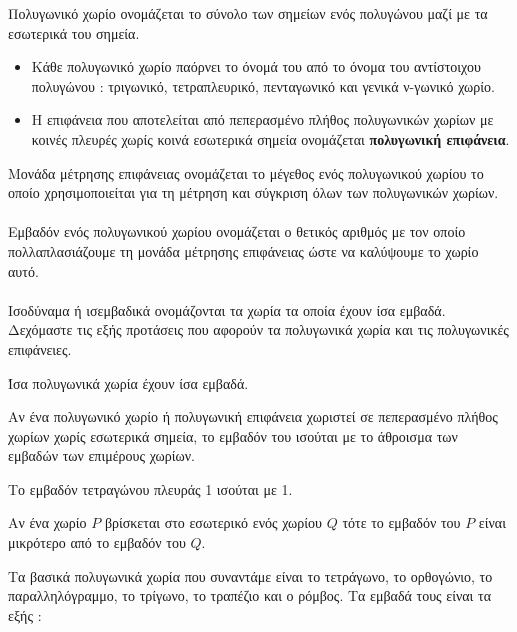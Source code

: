 \documentclass[twoside,nofonts,internet,shmeiwseis]{thewria}
\begin{document}
\orismoi
{}
Πολυγωνικό χωρίο ονομάζεται το σύνολο των σημείων ενός πολυγώνου μαζί με τα εσωτερικά του σημεία.
\begin{itemize}[itemsep=0mm]
\item Κάθε πολυγωνικό χωρίο παόρνει το όνομά του από το όνομα του αντίστοιχου πολυγώνου : τριγωνικό, τετραπλευρικό, πενταγωνικό και γενικά ν-γωνικό χωρίο.
\item Η επιφάνεια που αποτελείται από πεπερασμένο πλήθος πολυγωνικών χωρίων με κοινές πλευρές χωρίς κοινά εσωτερικά σημεία ονομάζεται \textbf{πολυγωνική επιφάνεια}.
\end{itemize}
Μονάδα μέτρησης επιφάνειας ονομάζεται το μέγεθος ενός πολυγωνικού χωρίου το οποίο χρησιμοποιείται για τη μέτρηση και σύγκριση όλων των πολυγωνικών χωρίων.\\\\
Εμβαδόν ενός πολυγωνικού χωρίου ονομάζεται ο θετικός αριθμός με τον οποίο πολλαπλασιάζουμε τη μονάδα μέτρησης επιφάνειας ώστε να καλύψουμε το χωρίο αυτό.\\\\
Ισοδύναμα ή ισεμβαδικά ονομάζονται τα χωρία τα οποία έχουν ίσα εμβαδά.
\thewrhmata
{}
Δεχόμαστε τις εξής προτάσεις που αφορούν τα πολυγωνικά χωρία και τις πολυγωνικές επιφάνειες.
\begin{rlist}
\item Ίσα πολυγωνικά χωρία έχουν ίσα εμβαδά.
\item Αν ένα πολυγωνικό χωρίο ή πολυγωνική επιφάνεια χωριστεί σε πεπερασμένο πλήθος χωρίων χωρίς εσωτερικά σημεία, το εμβαδόν του ισούται με το άθροισμα των εμβαδών των επιμέρους χωρίων.
\item Το εμβαδόν τετραγώνου πλευράς 1 ισούται με 1.
\item Αν ένα χωρίο $ P $ βρίσκεται στο εσωτερικό ενός χωρίου $ Q $ τότε το εμβαδόν του $ P $ είναι μικρότερο από το εμβαδόν του $ Q $.
\end{rlist}
\newpage
\noindent
{}
Τα βασικά πολυγωνικά χωρία που συναντάμε είναι το τετράγωνο, το ορθογώνιο, το παραλληλόγραμμο, το τρίγωνο, το τραπέζιο και ο ρόμβος. Τα εμβαδά τους είναι τα εξής :
\end{document}
